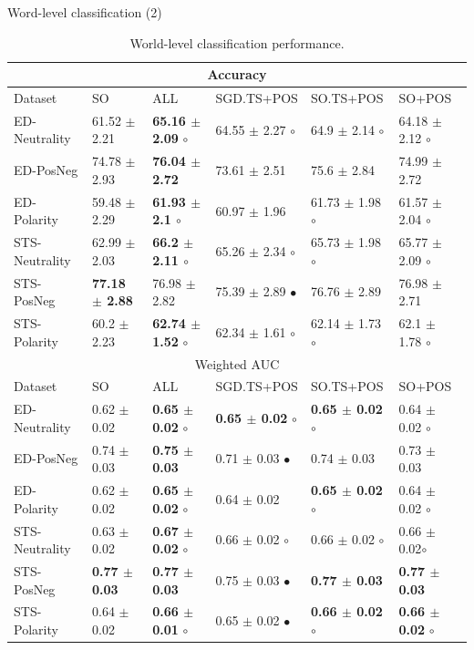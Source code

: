 \documentclass[handout]{beamer}
\begin{document}
\begin{frame}{Word-level classification (2)}
\tiny
\begin{table}[!htb]
\begin{center}
\begin{tabular}{l|l|l|l|l|l}
\hline \hline
\multicolumn{ 6}{c}{Accuracy } \\ \hline \hline
Dataset & SO & ALL & SGD.TS+POS & SO.TS+POS & SO+POS \\ \hline
ED-Neutrality & 61.52 $\pm$ 2.21 & \textbf{65.16 $\pm$ 2.09} $\circ$ & 64.55 $\pm$ 2.27 $\circ$ & 64.9 $\pm$ 2.14  $\circ$ & 64.18 $\pm$ 2.12 $\circ$ \\ 
ED-PosNeg & 74.78 $\pm$ 2.93 & \textbf{76.04 $\pm$ 2.72} & 73.61 $\pm$ 2.51 & 75.6 $\pm$ 2.84 & 74.99 $\pm$ 2.72 \\ 
ED-Polarity & 59.48 $\pm$ 2.29 & \textbf{61.93 $\pm$ 2.1 $\circ$} & 60.97 $\pm$ 1.96 & 61.73 $\pm$ 1.98 $\circ$ & 61.57 $\pm$ 2.04 $\circ$ \\  \hline
STS-Neutrality & 62.99 $\pm$ 2.03 & \textbf{66.2 $\pm$ 2.11 $\circ$} & 65.26 $\pm$ 2.34 $\circ$ & 65.73 $\pm$ 1.98 $\circ$ & 65.77 $\pm$ 2.09 $\circ$ \\ 
STS-PosNeg & \textbf{77.18 $\pm$ 2.88} & 76.98 $\pm$ 2.82 & 75.39 $\pm$ 2.89 $\bullet$ & 76.76 $\pm$ 2.89 & 76.98 $\pm$ 2.71 \\ 
STS-Polarity & 60.2 $\pm$ 2.23 & \textbf{62.74 $\pm$ 1.52} $\circ$ & 62.34 $\pm$ 1.61 $\circ$ & 62.14 $\pm$ 1.73 $\circ$ & 62.1 $\pm$ 1.78 $\circ$ \\  \hline \hline
\multicolumn{ 6}{c}{Weighted AUC } \\ \hline \hline
Dataset & SO & ALL & SGD.TS+POS & SO.TS+POS & SO+POS \\ \hline
ED-Neutrality & 0.62 $\pm$ 0.02 &  \textbf{0.65 $\pm$ 0.02} $\circ$ & \textbf{0.65 $\pm$ 0.02} $\circ$  & \textbf{0.65 $\pm$ 0.02} $\circ$ & 0.64 $\pm$ 0.02 $\circ$ \\ 
ED-PosNeg & 0.74 $\pm$ 0.03 & \textbf{0.75 $\pm$ 0.03} & 0.71 $\pm$ 0.03 $\bullet$ & 0.74 $\pm$ 0.03 & 0.73 $\pm$ 0.03 \\ 
ED-Polarity & 0.62 $\pm$ 0.02 &  \textbf{0.65 $\pm$0.02} $\circ$ & 0.64 $\pm$ 0.02 & \textbf{0.65 $\pm$ 0.02} $\circ$ & 0.64 $\pm$ 0.02 $\circ$ \\ \hline
STS-Neutrality & 0.63 $\pm$ 0.02 & \textbf{0.67 $\pm$ 0.02} $\circ$             & 0.66 $\pm$ 0.02 $\circ$  & 0.66 $\pm$ 0.02 $\circ$ & 0.66 $\pm$ 0.02$\circ$ \\ 
STS-PosNeg & \textbf{0.77 $\pm$ 0.03} &  \textbf{0.77 $\pm$ 0.03} & 0.75 $\pm$ 0.03 $\bullet$ & \textbf{0.77 $\pm$ 0.03} & \textbf{0.77 $\pm$ 0.03} \\ 
STS-Polarity & 0.64 $\pm$ 0.02 & \textbf{0.66 $\pm$ 0.01} $\circ$  & 0.65 $\pm$ 0.02 $\bullet$  & \textbf{0.66 $\pm$ 0.02} $\circ$ & \textbf{0.66 $\pm$ 0.02} $\circ$ \\ \hline 
\end{tabular}
\end{center}
\caption{World-level classification performance.} 
\label{tab:classres}
\end{table}


\end{frame}
\end{document}
